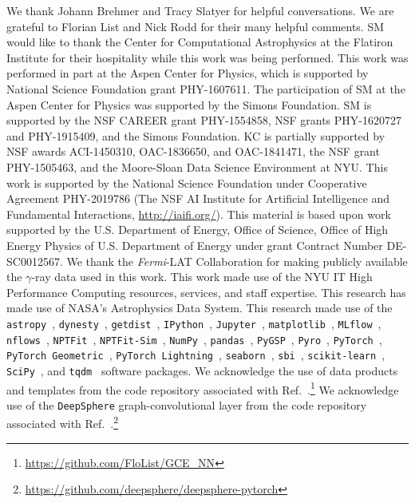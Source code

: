 \documentclass[]{article}
\newcommand{\Fermi}{\emph{Fermi}\xspace}
\begin{document}
\begin{ack}
We thank Johann Brehmer and Tracy Slatyer for helpful conversations. We are grateful to Florian List and Nick Rodd for their many helpful comments.
SM would like to thank the Center for Computational Astrophysics at the Flatiron Institute for their hospitality while this work was being performed. 
This work was performed in part at the Aspen Center for Physics, which is supported by National Science Foundation grant PHY-1607611.
The participation of SM at the Aspen Center for Physics was supported by the Simons Foundation.
SM is supported by the NSF CAREER grant PHY-1554858, NSF grants PHY-1620727 and PHY-1915409, and the Simons Foundation. 
KC is partially supported by NSF awards ACI-1450310, OAC-1836650, and OAC-1841471, the NSF grant PHY-1505463, and the Moore-Sloan Data Science Environment at NYU. 
This work is supported by the National Science Foundation under Cooperative Agreement PHY-2019786 (The NSF AI Institute for Artificial Intelligence and Fundamental Interactions, \url{http://iaifi.org/}).
This material is based upon work supported by the U.S. Department of Energy, Office of Science, Office of High Energy Physics of U.S. Department of Energy under grant Contract Number DE-SC0012567.
We thank the \Fermi-LAT Collaboration for making publicly available the $\gamma$-ray data used in this work.
This work made use of the NYU IT High Performance Computing resources, services, and staff expertise. 
This research has made use of NASA's Astrophysics Data System. 
This research made use of the \texttt{astropy}~\cite{Price-Whelan:2018hus,Robitaille:2013mpa}, \texttt{dynesty}~\cite{Speagle_2020}, \texttt{getdist}~\cite{Lewis:2019xzd}, \texttt{IPython}~\cite{PER-GRA:2007}, \texttt{Jupyter}~\cite{Kluyver2016JupyterN}, \texttt{matplotlib}~\cite{Hunter:2007}, \texttt{MLflow}~\cite{10.1145/3399579.3399867}, \texttt{nflows}~\cite{nflows}, \texttt{NPTFit}~\cite{Mishra-Sharma:2016gis}, \texttt{NPTFit-Sim}~\cite{NPTFit-Sim}, \texttt{NumPy}~\cite{harris2020array}, \texttt{pandas}~\cite{pandas:2010}, \texttt{PyGSP}~\cite{michael_defferrard_2017_1003158}, \texttt{Pyro}~\cite{bingham2019pyro}, \texttt{PyTorch}~\cite{NEURIPS2019_9015}, \texttt{PyTorch Geometric}~\cite{Fey/Lenssen/2019}, \texttt{PyTorch Lightning}~\cite{william_falcon_2020_3828935}, \texttt{seaborn}~\cite{seaborn}, \texttt{sbi}~\cite{tejero-cantero2020sbi}, \texttt{scikit-learn}~\cite{JMLR:v12:pedregosa11a}, \texttt{SciPy}~\cite{2020SciPy-NMeth}, and \texttt{tqdm}~\cite{casper_da_costa_luis_2021_5517697} software packages. We acknowledge the use of data products and templates from the code repository associated with Ref.~\cite{List:2020mzd}.\footnote{\url{https://github.com/FloList/GCE_NN}} We acknowledge use of the \texttt{DeepSphere} graph-convolutional layer from the code repository associated with Ref.~\cite{DBLP:conf/iclr/DefferrardMGP20}.\footnote{\url{https://github.com/deepsphere/deepsphere-pytorch}}
\end{ack}
\end{document}
